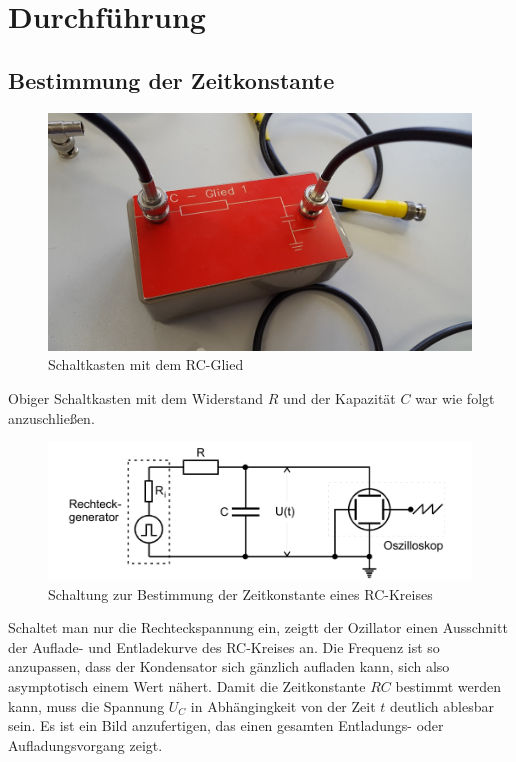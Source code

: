 \section{Durchführung}
\label{sec:Durchführung}


\subsection{Bestimmung der Zeitkonstante}

\begin{figure}
    \centering
    \includegraphics[width=\textwidth/2]{images/foto_schaltung.jpg}
    \caption{Schaltkasten mit dem RC-Glied  \cite{V353}}
    \label{fig:schaltung_3}
\end{figure}

Obiger Schaltkasten mit dem Widerstand $R$ und der Kapazität $C$ war wie folgt anzuschließen.

\begin{figure}
    \centering
    \includegraphics[width=\textwidth/2]{images/schaltung_3.png}
    \caption{Schaltung zur Bestimmung der Zeitkonstante eines RC-Kreises  \cite{V353}}
    \label{fig:schaltung_3}
\end{figure}

Schaltet man nur die Rechteckspannung ein, zeigtt der Ozillator einen Ausschnitt der Auflade- und Entladekurve des RC-Kreises an. Die Frequenz ist so anzupassen, dass der Kondensator sich gänzlich aufladen kann, sich also asymptotisch einem Wert nähert. Damit die Zeitkonstante $RC$ bestimmt werden kann, muss die Spannung $U_C$ in Abhängingkeit von der Zeit $t$ deutlich ablesbar sein. Es ist ein Bild anzufertigen, das einen gesamten Entladungs- oder Aufladungsvorgang zeigt. 


